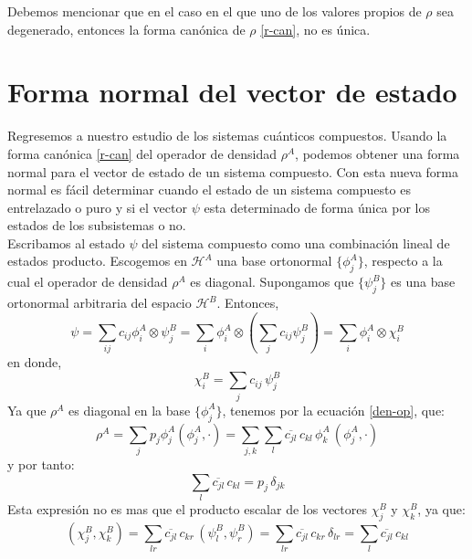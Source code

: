\documentclass[12pt]{book}
\numberwithin{equation}{chapter}
\def\ol{\overline}
\def\H{\mathcal{H}}
\def\pr{\otimes}
\begin{document}
\rightline{$\dag$}
\vspace{5 mm}

Debemos mencionar que en el caso en el que uno de los valores propios de $\rho$ sea degenerado, entonces la forma can\'onica de $\rho$ \eqref{r-can}, no es \'unica.

\section{Forma normal del vector de estado}
Regresemos a nuestro estudio de los sistemas cu\'anticos compuestos. Usando la forma can\'onica \eqref{r-can} del operador de densidad $\rho^{A}$, podemos obtener una forma normal para el vector de estado de un sistema compuesto. Con esta nueva forma normal es f\'acil determinar cuando el estado de un sistema compuesto es entrelazado o puro y si el vector $\psi$ esta determinado de forma \'unica por los estados de los subsistemas o no.\\
Escribamos al estado $\psi$ del sistema compuesto como una combinaci\'on lineal de estados producto. Escogemos en $\H^{A}$ una base ortonormal $\{ \phi_{j}^{A} \}$, respecto a la cual el operador de densidad $\rho^{A}$ es diagonal. Supongamos que $\{ \psi_{j}^{B} \}$ es una base ortonormal arbitraria del espacio $\H^{B}$. Entonces,
\begin{equation}\label{nor-f}
\psi = \sum_{ij} c_{ij} \phi_{i}^{A} \pr  \psi_{j}^{B} = \sum_{i} \phi_{i}^{A} \pr \left( \sum_{j} c_{ij}\psi_{j}^{B}  \right) = \sum_{i} \phi_{i}^{A} \pr \chi_{i}^{B}
\end{equation}
en donde,
\begin{equation}
\chi_{i}^{B} = \sum_{j} c_{ij}\, \psi_{j}^{B}
\end{equation} 
Ya que $\rho^{A}$ es diagonal en la base $\{ \phi_{j}^{A} \}$, tenemos por la ecuaci\'on \eqref{den-op}, que:
\begin{equation}
\rho^{A}= \sum_{j} p_{j} \phi_{j}^{A} ( \phi_{j}^{A}, \cdot ) = \sum_{j,k} \sum_{l} \ol{c_{jl}} \, c_{kl} \, \phi_{k}^{A}\, ( \phi_{j}^{A}, \cdot )
\end{equation}
y por tanto:
\begin{equation}
\sum_{l} \ol{c_{jl}} \, c_{kl} = p_{j}\, \delta_{jk}
\end{equation}
Esta expresi\'on no es mas que el producto escalar de los vectores $\chi_{j}^{B}$ y $\chi_{k}^{B}$, ya que:
$$ ( \chi_{j}^{B},\chi_{k}^{B} )= \sum_{lr} \ol{c_{jl}}\, c_{kr}\, (\psi_{l}^{B},\psi_{r}^{B}) = \sum_{lr} \ol{c_{jl}}\, c_{kr}\, \delta_{lr} = \sum_{l} \ol{c_{jl}}\, c_{kl} $$ 
\end{document}
